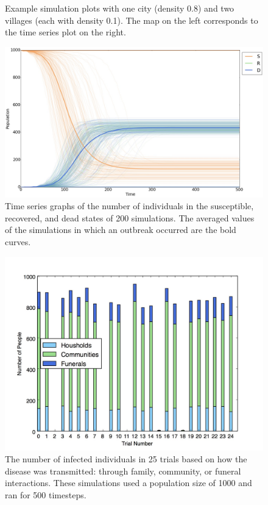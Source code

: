 \begin{figure}
\caption{Example simulation plots with one city (density 0.8) and two villages (each with density 0.1). The map on the left corresponds to the time series plot on the right.}\label{sabd:ex}
\end{figure}

\begin{figure}
  \centering
  \includegraphics[width=\textwidth]{av-time}
  \caption{Time series graphs of the number of individuals in the susceptible, recovered, and dead states of 200 simulations. The averaged values of the simulations in which an outbreak occurred are the bold curves.}
  \label{fig:av-time}
\end{figure}

\begin{figure}
  \centering
  \includegraphics[width=.75\textwidth]{infecttypes}
  \caption{The number of infected individuals in 25 trials based on how the disease was transmitted: through family, community, or funeral interactions. These simulations used a population size of 1000 and ran for 500 timesteps.}
  \label{fig:infecttypes}
\end{figure}

